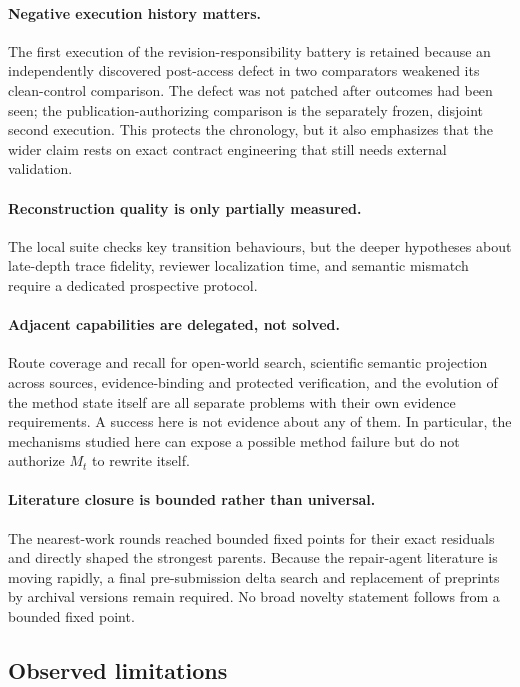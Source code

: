 \paragraph{Negative execution history matters.}
The first execution of the revision-responsibility battery is retained because
an independently discovered post-access defect in two comparators weakened its
clean-control comparison. The defect was not patched after outcomes had been
seen; the publication-authorizing comparison is the separately frozen, disjoint
second execution. This protects the chronology, but it also emphasizes that the
wider claim rests on exact contract engineering that still needs external
validation.

\paragraph{Reconstruction quality is only partially measured.}
The local suite checks key transition behaviours, but the deeper hypotheses
about late-depth trace fidelity, reviewer localization time, and semantic
mismatch require a dedicated prospective protocol.

\paragraph{Adjacent capabilities are delegated, not solved.}
Route coverage and recall for open-world search, scientific semantic projection
across sources, evidence-binding and protected verification, and the evolution
of the method state itself are all separate problems with their own evidence
requirements. A success here is not evidence about any of them. In particular,
the mechanisms studied here can expose a possible method failure but do not
authorize $M_t$ to rewrite itself.

\paragraph{Literature closure is bounded rather than universal.}
The nearest-work rounds reached bounded fixed points for their exact residuals
and directly shaped the strongest parents. Because the repair-agent literature
is moving rapidly, a final pre-submission delta search and replacement of
preprints by archival versions remain required. No broad novelty statement
follows from a bounded fixed point.

\subsection{Observed limitations}

